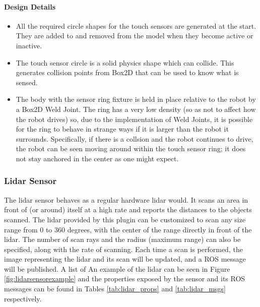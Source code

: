 \begin{itemize}
\paragraph{Design Details}
\begin{itemize}
	\item All the required circle shapes for the touch sensors are generated at the start. They are added to and removed from the model when they become active or inactive.
	\item The touch sensor circle is a solid physics shape which can collide. This generates collision points from Box2D that can be used to know what is sensed.
	\item The body with the sensor ring fixture is held in place relative to the robot by a Box2D Weld Joint. The ring has a very low density (so as not to affect how the robot drives) so, due to the implementation of Weld Joints,  it is possible for the ring to behave in strange ways if it is larger than the robot it surrounds. Specifically, if there is a collsion and the robot continues to drive, the robot can be seen moving around within the touch sensor ring; it does not stay anchored in the center as one might expect.
\end{itemize}
\subsubsection*{Lidar Sensor}
The lidar sensor behaves as a regular hardware lidar would. It scans an area in front of (or around) itself at a high rate and reports the distances to the objects scanned. The lidar provided by this plugin can be customized to scan any size range from 0 to 360 degrees, with the center of the range directly in front of the lidar. The number of scan rays and the radius (maximum range) can also be specified, along with the rate of scanning. Each time a scan is performed, the image representing the lidar and its scan will be updated, and a ROS message will be published. A list of An example of the lidar can be seen in Figure \ref{fig:lidarsensorexample} and the properties exposed by the sensor and its ROS messages can be found in Tables \ref{tab:lidar_props} and \ref{tab:lidar_msgs} respectively.


\end{itemize}
